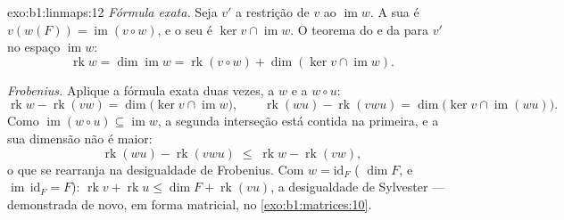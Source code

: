 \begin{solution}{exo:b1:linmaps:12}
\emph{Fórmula exata.} Seja $v'$ a restrição de $v$ ao 
$\operatorname{im} w$. A sua  é $v(w(F)) =
\operatorname{im}(v \circ w)$, e o seu  é $\ker v \cap
\operatorname{im} w$. O teorema do
 e da  para $v'$ no espaço $\operatorname{im} w$:
\[
\operatorname{rk} w = \dim\operatorname{im} w
= \operatorname{rk}(v \circ w) + \dim(\ker v \cap
\operatorname{im} w) .
\]

\emph{Frobenius.} Aplique a fórmula exata duas vezes, a $w$ e a
$w \circ u$:
\[
\operatorname{rk} w - \operatorname{rk}(vw)
= \dim\bigl(\ker v \cap \operatorname{im} w\bigr),
\qquad
\operatorname{rk}(wu) - \operatorname{rk}(vwu)
= \dim\bigl(\ker v \cap \operatorname{im}(wu)\bigr) .
\]
Como $\operatorname{im}(w \circ u) \subseteq \operatorname{im}
w$, a segunda interseção está contida na primeira, e a sua
dimensão não é maior:
\[
\operatorname{rk}(wu) - \operatorname{rk}(vwu)
\;\leq\; \operatorname{rk} w - \operatorname{rk}(vw) ,
\]
o que se rearranja na desigualdade de Frobenius. Com $w =
\mathrm{id}_F$ (
$\dim F$, e $\operatorname{im}\,
\mathrm{id}_F = F$): $\operatorname{rk} v + \operatorname{rk} u
\leq \dim F + \operatorname{rk}(vu)$, a desigualdade de Sylvester ---
demonstrada de novo, em forma matricial, no \cref{exo:b1:matrices:10}.
\end{solution}

